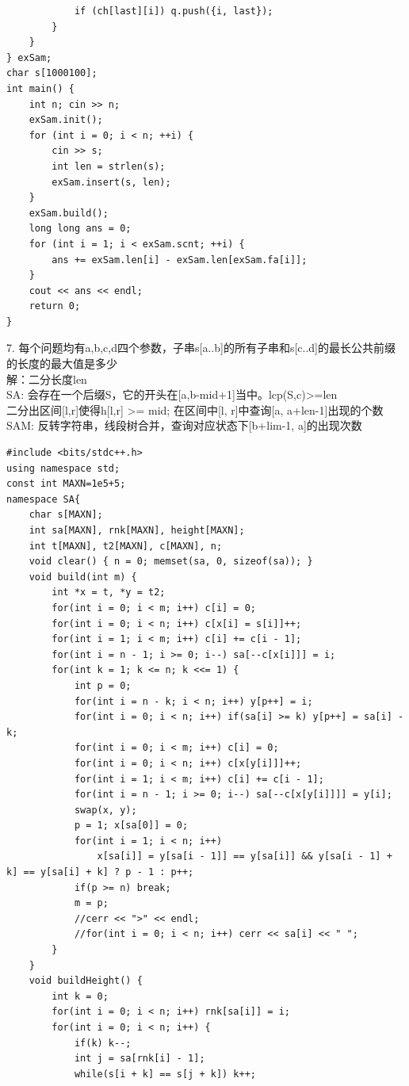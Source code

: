 \documentclass[10pt]{ctexart}
\begin{document}
{\begin{lstlisting}
            if (ch[last][i]) q.push({i, last});
        }
    }
} exSam;
char s[1000100];
int main() {
    int n; cin >> n;
    exSam.init();
    for (int i = 0; i < n; ++i) {
        cin >> s;
        int len = strlen(s);
        exSam.insert(s, len);
    }
    exSam.build();
    long long ans = 0;
    for (int i = 1; i < exSam.scnt; ++i) {
        ans += exSam.len[i] - exSam.len[exSam.fa[i]];
    }
    cout << ans << endl;
    return 0;
}
\end{lstlisting}
7. 每个问题均有a,b,c,d四个参数，子串s[a..b]的所有子串和s[c..d]的最长公共前缀的长度的最大值是多少\\
解：二分长度len\\
SA: 会存在一个后缀S，它的开头在[a,b-mid+1]当中。lcp(S,c)>=len\\
二分出区间[l,r]使得h[l,r] >= mid; 在区间中[l, r]中查询[a, a+len-1]出现的个数\\
SAM: 反转字符串，线段树合并，查询对应状态下[b+lim-1, a]的出现次数\\
\begin{lstlisting}
#include <bits/stdc++.h>
using namespace std;
const int MAXN=1e5+5;
namespace SA{
    char s[MAXN];
    int sa[MAXN], rnk[MAXN], height[MAXN];
    int t[MAXN], t2[MAXN], c[MAXN], n;
    void clear() { n = 0; memset(sa, 0, sizeof(sa)); }
    void build(int m) {
        int *x = t, *y = t2;
        for(int i = 0; i < m; i++) c[i] = 0;
        for(int i = 0; i < n; i++) c[x[i] = s[i]]++;
        for(int i = 1; i < m; i++) c[i] += c[i - 1];
        for(int i = n - 1; i >= 0; i--) sa[--c[x[i]]] = i;
        for(int k = 1; k <= n; k <<= 1) {
            int p = 0;
            for(int i = n - k; i < n; i++) y[p++] = i;
            for(int i = 0; i < n; i++) if(sa[i] >= k) y[p++] = sa[i] - k;
            for(int i = 0; i < m; i++) c[i] = 0;
            for(int i = 0; i < n; i++) c[x[y[i]]]++;
            for(int i = 1; i < m; i++) c[i] += c[i - 1];
            for(int i = n - 1; i >= 0; i--) sa[--c[x[y[i]]]] = y[i];
            swap(x, y);
            p = 1; x[sa[0]] = 0;
            for(int i = 1; i < n; i++)
                x[sa[i]] = y[sa[i - 1]] == y[sa[i]] && y[sa[i - 1] + k] == y[sa[i] + k] ? p - 1 : p++;
            if(p >= n) break;
            m = p;
            //cerr << ">" << endl;
            //for(int i = 0; i < n; i++) cerr << sa[i] << " ";
        }
    }
    void buildHeight() {
        int k = 0;
        for(int i = 0; i < n; i++) rnk[sa[i]] = i;
        for(int i = 0; i < n; i++) {
            if(k) k--;
            int j = sa[rnk[i] - 1];
            while(s[i + k] == s[j + k]) k++;

\end{lstlisting}}
\end{document}
